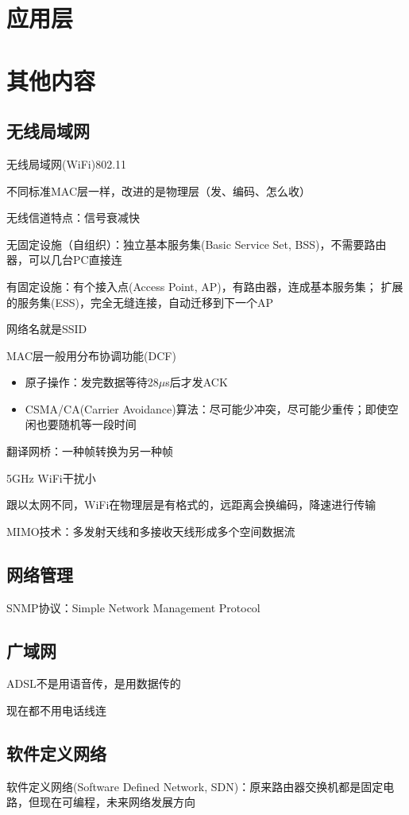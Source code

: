 
\section{应用层}

\section{其他内容}
\subsection{无线局域网}
无线局域网(WiFi)802.11

不同标准MAC层一样，改进的是物理层（发、编码、怎么收）

无线信道特点：信号衰减快

无固定设施（自组织）：独立基本服务集(Basic Service Set, BSS)，不需要路由器，可以几台PC直接连

有固定设施：有个接入点(Access Point, AP)，有路由器，连成基本服务集；
扩展的服务集(ESS)，完全无缝连接，自动迁移到下一个AP

网络名就是SSID

MAC层一般用分布协调功能(DCF)
\begin{itemize}
\item 原子操作：发完数据等待28$\mu$s后才发ACK
\item CSMA/CA(Carrier Avoidance)算法：尽可能少冲突，尽可能少重传；即使空闲也要随机等一段时间
\end{itemize}

翻译网桥：一种帧转换为另一种帧

5GHz WiFi干扰小

跟以太网不同，WiFi在物理层是有格式的，远距离会换编码，降速进行传输

MIMO技术：多发射天线和多接收天线形成多个空间数据流

\subsection{网络管理}
SNMP协议：Simple Network Management Protocol

\subsection{广域网}
ADSL不是用语音传，是用数据传的

现在都不用电话线连

\subsection{软件定义网络}
软件定义网络(Software Defined Network, SDN)：原来路由器交换机都是固定电路，但现在可编程，未来网络发展方向

